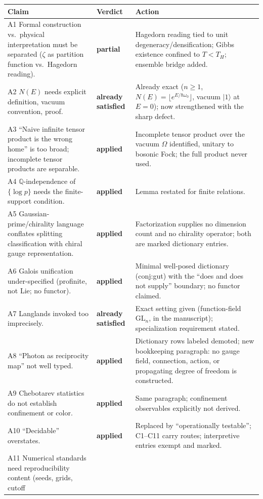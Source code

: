 \documentclass[11pt,a4paper]{article}
\newcommand{\ok}{\textbf{applied}}
\newcommand{\ket}[1]{\lvert #1\rangle}
\newcommand{\Qq}{\mathbb{Q}}
\newcommand{\pver}{\textbf{partial}}
\newcommand{\sat}{\textbf{already satisfied}}
\begin{document}
\begin{longtable}{@{}p{}p{}p{}@{}}
\toprule
\textbf{Claim} & \textbf{Verdict} & \textbf{Action}\\
\midrule
\endhead
A1 Formal construction vs.\ physical interpretation must be separated ($\zeta$
as partition function vs.\ Hagedorn reading). & \pver & Hagedorn reading tied
to unit degeneracy/densification; Gibbs existence confined to $T<T_H$; ensemble
bridge added.\\
A2 $N(E)$ needs explicit definition, vacuum convention, proof. & \sat &
Already exact ($n\ge1$, $N(E)=\lfloor e^{E/\hbar\omega_0}\rfloor$, vacuum
$\ket1$ at $E=0$); now strengthened with the sharp defect.\\
A3 ``Naive infinite tensor product is the wrong home'' is too broad; incomplete
tensor products are separable. & \ok & Incomplete tensor product over the
vacuum $\Omega$ identified, unitary to bosonic Fock; the full product never
used.\\
A4 $\Qq$-independence of $\{\log p\}$ needs the finite-support condition. &
\ok & Lemma restated for finite relations.\\
A5 Gaussian-prime/chirality language conflates splitting classification with
chiral gauge representation. & \ok & Factorization supplies no dimension count
and no chirality operator; both are marked dictionary entries.\\
A6 Galois unification under-specified (profinite, not Lie; no functor). & \ok &
Minimal well-posed dictionary (conj:gut) with the ``does and does not supply''
boundary; no functor claimed.\\
A7 Langlands invoked too imprecisely. & \sat & Exact setting given
(function-field $\mathrm{GL}_n$, \cite{lafforgue2002} in the manuscript);
specialization requirement stated.\\
A8 ``Photon as reciprocity map'' not well typed. & \ok & Dictionary rows
labeled demoted; new bookkeeping paragraph: no gauge field, connection, action,
or propagating degree of freedom is constructed.\\
A9 Chebotarev statistics do not establish confinement or color. & \ok & Same
paragraph; confinement observables explicitly not derived.\\
A10 ``Decidable'' overstates. & \ok & Replaced by ``operationally testable'';
C1--C11 carry routes; interpretive entries exempt and marked.\\
A11 Numerical standards need reproducibility content (seeds, grids, cutoff

\end{longtable}
\end{document}

